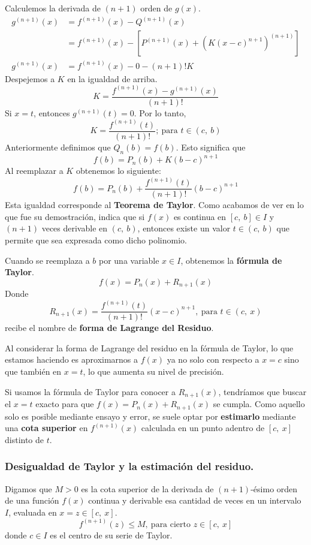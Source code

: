 \documentclass[12pt]{article}
\begin{document}
Calculemos la derivada de $(n + 1)$ orden de $g(x)$.
\begin{align*}
  g^{(n + 1)}(x) &= f^{(n + 1)}(x) - Q^{(n + 1)}(x) \\
                 &= f^{(n + 1)}(x) - \left[P^{(n + 1)}(x) + (K(x - c)^{n + 1})^{(n + 1)}\right] \\
  g^{(n + 1)}(x) &= f^{(n + 1)}(x) - 0 - (n + 1)!K
\end{align*}
Despejemos a $K$ en la igualdad de arriba.
\[
  K = \frac{f^{(n + 1)}(x) - g^{(n + 1)}(x)}{(n + 1)!}
\]
Si $x = t$, entonces $g^{(n + 1)}(t) = 0$. Por lo tanto,
\[
  K = \frac{f^{(n + 1)}(t)}{(n + 1)!}; \ \text{para } t \in (c, \ b)
\]
Anteriormente definimos que $Q_{n}(b) = f(b)$. Esto significa que
\[
  f(b) = P_{n}(b) + K(b - c)^{n + 1}
\]
Al reemplazar a $K$ obtenemos lo siguiente:
\[
  f(b) = P_{n}(b) + \frac{f^{(n + 1)}(t)}{(n + 1)!} (b - c)^{n + 1}
\]
Esta igualdad corresponde al \textbf{Teorema de Taylor}. Como acabamos de ver en lo que fue su demostración, indica que si $f(x)$ es continua en $[c, \ b] \in I$ y $(n + 1)$ veces derivable en $(c, \ b)$, entonces existe un valor $t \in (c, \ b)$ que permite que sea expresada como dicho polinomio.

Cuando se reemplaza a $b$ por una variable $x \in I$, obtenemos la \textbf{fórmula de Taylor}.
\[
  f(x) = P_{n}(x) + R_{n + 1}(x)
\]
Donde
\[
  R_{n + 1}(x) = \frac{f^{(n + 1)}(t)}{(n + 1)!} (x - c)^{n + 1}, \ \text{para } t \in (c, \ x)
\]
recibe el nombre de \textbf{forma de Lagrange del Residuo}.

Al considerar la forma de Lagrange del residuo en la fórmula de Taylor, lo que estamos haciendo es aproximarnos a $f(x)$ ya no solo con respecto a $x = c$ sino que también en $x = t$, lo que aumenta su nivel de precisión.

Si usamos la fórmula de Taylor para conocer a $R_{n + 1}(x)$, tendríamos que buscar el $x = t$ exacto para que $f(x) = P_{n}(x) + R_{n + 1}(x)$ se cumpla. Como aquello solo es posible mediante ensayo y error, se suele optar por \textbf{estimarlo} mediante una \textbf{cota superior} en $f^{(n + 1)}(x)$ calculada en un punto adentro de $[c, \ x]$ distinto de $t$.

\subsubsection{Desigualdad de Taylor y la estimación del residuo.}

Digamos que $M > 0$ es la cota superior de la derivada de $(n + 1)$-ésimo orden de una función $f(x)$ continua y derivable esa cantidad de veces en un intervalo $I$, evaluada en $x = z \in [c, \ x]$.
\[
  f^{(n + 1)}(z) \leq M, \ \text{para cierto } z \in [c, \ x]
\]
donde $c \in I$ es el centro de su serie de Taylor.
\end{document}
